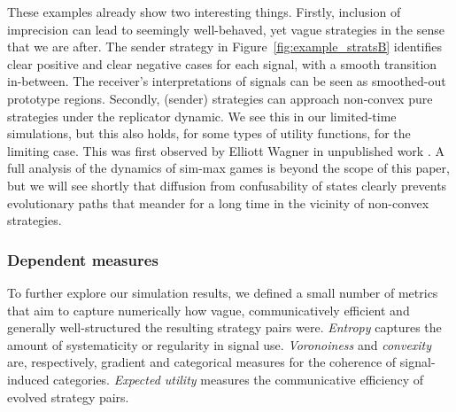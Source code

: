 \documentclass[fleqn,reqno,10pt]{article}
\begin{document}
These examples already show two interesting things. Firstly, inclusion
of imprecision can lead to seemingly well-behaved, yet vague
strategies in the sense that we are after. The sender strategy in
Figure~\ref{fig:example_stratsB} identifies clear positive and clear
negative cases for each signal, with a smooth transition
in-between. The receiver's interpretations of signals can be seen as
smoothed-out prototype regions. Secondly, (sender) strategies can
approach non-convex pure strategies under the replicator dynamic. We
see this in our limited-time simulations, but this also holds, for
some types of utility functions, for the limiting case. This was first
observed by Elliott Wagner in unpublished work
\citep[c.f.][]{OConnor2013:Evolving-Percep}. A full analysis of the
dynamics of sim-max games is beyond the scope of this paper, but we
will see shortly that diffusion from confusability of states clearly
prevents evolutionary paths that meander for a long time in the
vicinity of non-convex strategies.



\subsubsection{Dependent measures}
 
To further explore our simulation results, we defined a small number
of metrics that aim to capture numerically how vague, communicatively
efficient and generally well-structured the resulting strategy pairs
were. \emph{Entropy} captures the amount of systematicity or
regularity in signal use. \emph{Voronoiness} and \emph{convexity} are,
respectively, gradient and categorical measures for the coherence of
signal-induced categories. \emph{Expected utility} measures the
communicative efficiency of evolved strategy pairs.
\end{document}
